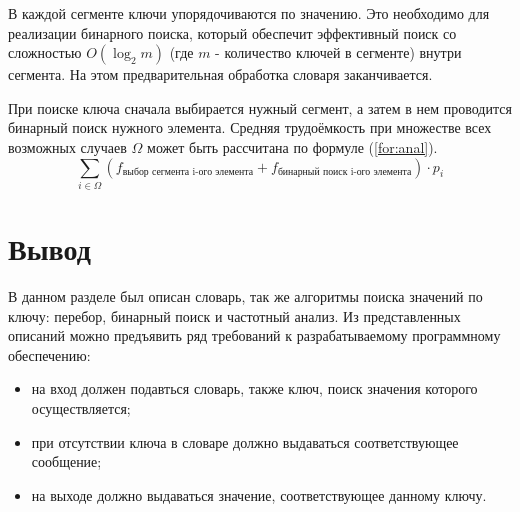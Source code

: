 В каждой сегменте ключи упорядочиваются по значению. Это необходимо для
реализации бинарного поиска, который обеспечит эффективный поиск со сложностью
$O(\log_2 m)$ (где $m$ - количество ключей в сегменте) внутри сегмента.
На этом предварительная обработка словаря заканчивается.

При поиске ключа сначала выбирается нужный сегмент, а затем в нем проводится
бинарный поиск нужного элемента. Средняя трудоёмкость при множестве всех
возможных случаев $\Omega$ может быть рассчитана по формуле (\ref{for:anal}).
\begin{equation}\label{for:anal}
    \sum_{i \in \Omega}{\left(f_{\text{выбор сегмента i-ого элемента}} +
    f_{\text{бинарный поиск i-ого элемента}}\right)} \cdot p_i
\end{equation}

\section{Вывод}

В данном разделе был описан словарь, так же алгоритмы поиска значений по ключу:
перебор, бинарный поиск и частотный анализ. Из представленных описаний можно
предъявить ряд требований к разрабатываемому программному обеспечению:
\begin{itemize}[left=\parindent]
    \item на вход должен подавться словарь, также ключ, поиск значения которого
        осуществляется;
    \item при отсутствии ключа в словаре должно выдаваться соответствующее
          сообщение;
    \item на выходе должно выдаваться значение, соответствующее данному ключу.
\end{itemize}
